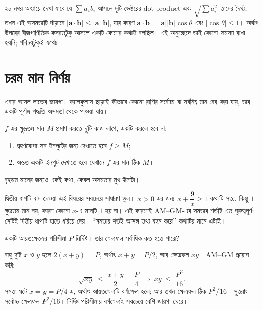 \documentclass[11pt]{article}
\begin{document}
\begin{remark}
২০ নম্বর অধ্যায়ে দেখা যাবে যে $\sum a_i b_i$ আসলে দুটি ভেক্টরের dot product
এবং $\sqrt{\sum a_i^2}$ তাদের দৈর্ঘ্য; তখন এই অসমতাটি দাঁড়াবে
$|\mathbf{a} \cdot \mathbf{b}| \leq |\mathbf{a}||\mathbf{b}|$, যার কারণ
$\mathbf{a} \cdot \mathbf{b} = |\mathbf{a}||\mathbf{b}| \cos\theta$ এবং
$|\cos\theta| \leq 1$। অর্থাৎ উপরের বীজগাণিতিক কসরতটুকু আসলে একটি কোণের কথাই
বলছিল। এই অনুচ্ছেদে তাই কোনো সমস্যা রাখা হয়নি; পরিচয়টুকুই যথেষ্ট।
\end{remark}

\section{চরম মান নির্ণয়}

এবার আসল লাভের জায়গা। ক্যালকুলাস ছাড়াই কীভাবে কোনো রাশির সর্বোচ্চ বা সর্বনিম্ন
মান বের করা যায়, তার একটি পূর্ণাঙ্গ পদ্ধতি অসমতা থেকে পাওয়া যায়।

\begin{idea}[সীমা প্লাস অর্জন]
$f$-এর ক্ষুদ্রতম মান $M$ প্রমাণ করতে দুটি কাজ লাগে, একটি করলে হবে না:
\begin{enumerate}
  \item গ্রহণযোগ্য সব ইনপুটের জন্য দেখাতে হবে $f \geq M$;
  \item অন্তত একটি ইনপুট দেখাতে হবে যেখানে $f$-এর মান ঠিক $M$।
\end{enumerate}
বৃহত্তম মানের জন্যও একই কথা, কেবল অসমতার মুখ উল্টো।
\end{idea}

\begin{remark}
দ্বিতীয় ধাপটি বাদ দেওয়া এই বিষয়ের সবচেয়ে সাধারণ ভুল। $x > 0$-এর জন্য
$x + \dfrac{9}{x} \geq 1$ কথাটি সত্য, কিন্তু $1$ ক্ষুদ্রতম মান নয়, কারণ কোনো
$x$-এ মানটি $1$ হয় না। এই কারণেই AM--GM-এর সমতার শর্তটি এত গুরুত্বপূর্ণ:
সেটিই দ্বিতীয় ধাপটি হাতে ধরিয়ে দেয়। ``সমতার শর্তই আসল তথ্য বহন করে'' কথাটির
মানে এটাই।
\end{remark}

\begin{example}
একটি আয়তক্ষেত্রের পরিসীমা $P$ নির্দিষ্ট। তার ক্ষেত্রফল সর্বাধিক কত হতে পারে?
\end{example}

\begin{solbox}
বাহু দুটি $x$ ও $y$ হলে $2(x+y) = P$, অর্থাৎ $x + y = P/2$, আর ক্ষেত্রফল $xy$।
AM--GM প্রয়োগ করি:
\[
  \sqrt{xy} \;\leq\; \frac{x+y}{2} = \frac{P}{4}
  \;\Longrightarrow\; xy \;\leq\; \frac{P^2}{16} .
\]
সমতা ঘটে $x = y = P/4$-এ, অর্থাৎ আয়তক্ষেত্রটি বর্গক্ষেত্র হলে; আর তখন ক্ষেত্রফল
ঠিক $P^2/16$। সুতরাং সর্বোচ্চ ক্ষেত্রফল $P^2/16$। নির্দিষ্ট পরিসীমায় বর্গক্ষেত্রই
সবচেয়ে বেশি জায়গা ঘেরে।
\end{solbox}
\end{document}
